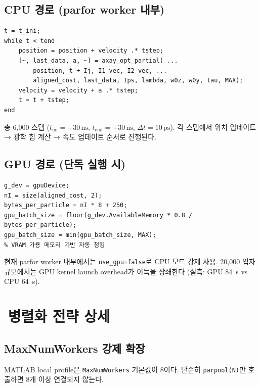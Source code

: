 \documentclass[11pt, a4paper]{article}
\newcommand{\emo}[1]{{\emojifont #1}}
\begin{document}
\subsection{CPU 경로 (parfor worker 내부)}

\begin{lstlisting}
t = t_ini;
while t < tend
    position = position + velocity .* tstep;
    [~, last_data, a, ~] = axay_opt_partial( ...
        position, t + Ij, I1_vec, I2_vec, ...
        aligned_cost, last_data, Ips, lambda, w0z, w0y, tau, MAX);
    velocity = velocity + a .* tstep;
    t = t + tstep;
end
\end{lstlisting}

\begin{tip}[💡]
총 6,000 스텝 ($t_\text{ini}=-30\,\text{ns}$, $t_\text{end}=+30\,\text{ns}$, $\Delta t=10\,\text{ps}$).
각 스텝에서 위치 업데이트 → 광학 힘 계산 → 속도 업데이트 순서로 진행된다.
\end{tip}

\subsection{GPU 경로 (단독 실행 시)}

\begin{lstlisting}
g_dev = gpuDevice;
nI = size(aligned_cost, 2);
bytes_per_particle = nI * 8 + 250;
gpu_batch_size = floor(g_dev.AvailableMemory * 0.8 / bytes_per_particle);
gpu_batch_size = min(gpu_batch_size, MAX);
% VRAM 가용 메모리 기반 자동 청킹
\end{lstlisting}

\begin{warn}[⚠️]
현재 parfor worker 내부에서는 \texttt{use\_gpu=false}로 CPU 모드 강제 사용.
20,000 입자 규모에서는 GPU kernel launch overhead가 이득을 상쇄한다
(실측: GPU 84~s vs CPU 64~s).
\end{warn}

\section{\emo{🔧}\enspace 병렬화 전략 상세}

\subsection{MaxNumWorkers 강제 확장}

MATLAB local profile은 \texttt{MaxNumWorkers} 기본값이 8이다.
단순히 \texttt{parpool(N)}만 호출하면 8개 이상 연결되지 않는다.
\end{document}
